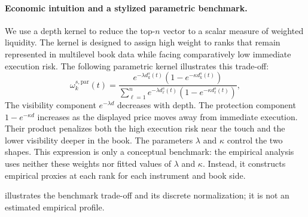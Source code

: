 \documentclass[11pt]{article}
\newenvironment{review}{\begingroup\color{blue}}{\endgroup}
\begin{document}
\paragraph{Economic intuition and a stylized parametric benchmark.}
We use a depth kernel to reduce the top-$n$ vector to \begin{review}a scalar measure of weighted liquidity\end{review}. The kernel is designed to assign
high weight to ranks that remain represented in multilevel book data while facing comparatively low immediate execution
risk. The following parametric kernel illustrates this trade-off:
\begin{equation}
    \omega^{s,\mathrm{par}}_{k}(t)
    =
    \frac{
        e^{-\lambda d^{s}_{k}(t)}
        \left(1-e^{-\kappa d^{s}_{k}(t)}\right)
    }{
        \sum_{\ell=1}^{n}
        e^{-\lambda d^{s}_{\ell}(t)}\left(
        1-e^{-\kappa d^{s}_{\ell}(t)}\right)
    },
    \label{eq:depth_kernel}
\end{equation}
The visibility component $e^{-\lambda d}$ decreases with depth. The protection component
$1-e^{-\kappa d}$ increases as the displayed price moves away from immediate execution. Their product penalizes both the
high execution risk near the touch and the lower visibility deeper in the book. The parameters $\lambda$ and $\kappa$
control the two shapes. This expression is only a conceptual benchmark: the empirical analysis uses neither these weights
nor fitted values of $\lambda$ and $\kappa$. Instead, it constructs \begin{review}empirical proxies at each rank\end{review} for each instrument and
book side.

 illustrates the benchmark trade-off and its discrete normalization; it is not an
estimated empirical profile.
\end{document}
